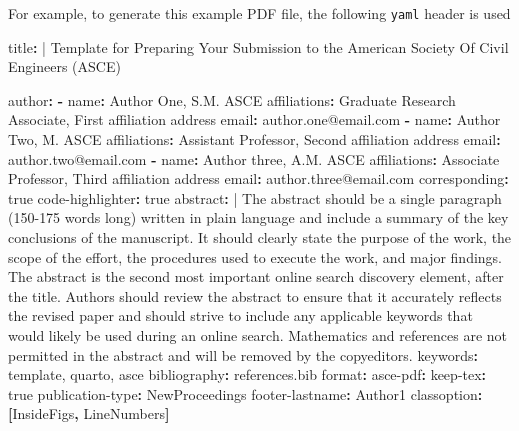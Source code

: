 \documentclass[Journal,LineNumbers]{ascelike-new}
\newenvironment{Shaded}{\begin{snugshade}}{\end{snugshade}}
\newcommand{\AttributeTok}[1]{\textcolor[rgb]{0.40,0.45,0.13}{#1}}
\newcommand{\CharTok}[1]{\textcolor[rgb]{0.13,0.47,0.30}{#1}}
\newcommand{\FunctionTok}[1]{\textcolor[rgb]{0.28,0.35,0.67}{#1}}
\newcommand{\KeywordTok}[1]{\textcolor[rgb]{0.00,0.23,0.31}{\textbf{#1}}}
\newcommand{\NormalTok}[1]{\textcolor[rgb]{0.00,0.23,0.31}{#1}}
\begin{document}
For example, to generate this example PDF file, the following
\texttt{yaml} header is used

\begin{Shaded}
\begin{Highlighting}[]
\FunctionTok{title}\KeywordTok{: }\CharTok{|}\AttributeTok{ }
\NormalTok{  Template for Preparing Your Submission to the }
\NormalTok{  American Society Of Civil Engineers (ASCE) }

\FunctionTok{author}\KeywordTok{:}
\AttributeTok{  }\KeywordTok{{-}}\AttributeTok{ }\FunctionTok{name}\KeywordTok{:}\AttributeTok{ Author One, S.M. ASCE}
\AttributeTok{    }\FunctionTok{affiliations}\KeywordTok{:}\AttributeTok{ Graduate Research Associate, First affiliation address}
\AttributeTok{    }\FunctionTok{email}\KeywordTok{:}\AttributeTok{ author.one@email.com}
\AttributeTok{  }\KeywordTok{{-}}\AttributeTok{ }\FunctionTok{name}\KeywordTok{:}\AttributeTok{ Author Two, M. ASCE}
\AttributeTok{    }\FunctionTok{affiliations}\KeywordTok{:}\AttributeTok{ Assistant Professor, Second affiliation address}
\AttributeTok{    }\FunctionTok{email}\KeywordTok{:}\AttributeTok{ author.two@email.com}
\AttributeTok{  }\KeywordTok{{-}}\AttributeTok{ }\FunctionTok{name}\KeywordTok{:}\AttributeTok{ Author three, A.M. ASCE}
\AttributeTok{    }\FunctionTok{affiliations}\KeywordTok{:}\AttributeTok{ Associate Professor, Third affiliation address}
\AttributeTok{    }\FunctionTok{email}\KeywordTok{:}\AttributeTok{ author.three@email.com}
\AttributeTok{    }\FunctionTok{corresponding}\KeywordTok{:}\AttributeTok{ }\CharTok{true}
\FunctionTok{code{-}highlighter}\KeywordTok{:}\AttributeTok{ }\CharTok{true}
\FunctionTok{abstract}\KeywordTok{: }\CharTok{|}
\NormalTok{  The abstract should be a single paragraph (150{-}175 words long) written}
\NormalTok{  in plain language and include a summary of the key conclusions of the}
\NormalTok{  manuscript. It should clearly state the purpose of the work, the scope}
\NormalTok{  of the effort, the procedures used to execute the work, and major}
\NormalTok{  findings. The abstract is the second most important online search}
\NormalTok{  discovery element, after the title. Authors should review the abstract}
\NormalTok{  to ensure that it accurately reflects the revised paper and should}
\NormalTok{  strive to include any applicable keywords that would likely be used}
\NormalTok{  during an online search. Mathematics and references are not permitted}
\NormalTok{  in the abstract and will be removed by the copyeditors.}
\FunctionTok{keywords}\KeywordTok{:}\AttributeTok{ template, quarto, asce}
\FunctionTok{bibliography}\KeywordTok{:}\AttributeTok{ references.bib}
\FunctionTok{format}\KeywordTok{:}\AttributeTok{ }
\AttributeTok{  }\FunctionTok{asce{-}pdf}\KeywordTok{:}
\AttributeTok{    }\FunctionTok{keep{-}tex}\KeywordTok{:}\AttributeTok{ }\CharTok{true}
\AttributeTok{    }\FunctionTok{publication{-}type}\KeywordTok{:}\AttributeTok{ NewProceedings}
\AttributeTok{    }\FunctionTok{footer{-}lastname}\KeywordTok{:}\AttributeTok{ Author1}
\AttributeTok{    }\FunctionTok{classoption}\KeywordTok{:}\AttributeTok{ }\KeywordTok{[}\AttributeTok{InsideFigs}\KeywordTok{,}\AttributeTok{ LineNumbers}\KeywordTok{]}
\end{Highlighting}
\end{Shaded}
\end{document}
